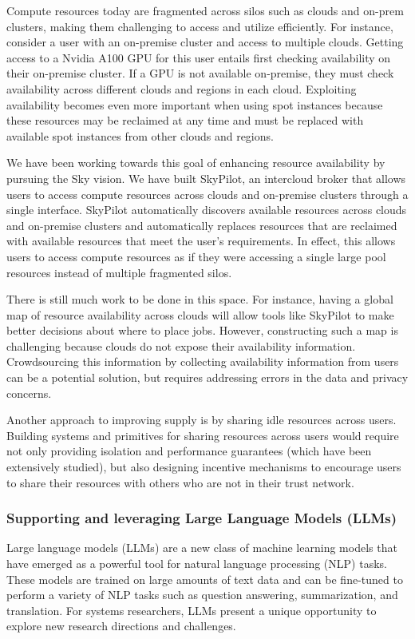 Compute resources today are fragmented across silos such as clouds and on-prem clusters, making them challenging to access and utilize efficiently. For instance, consider a user with an on-premise cluster and access to multiple clouds. Getting access to a Nvidia A100 GPU for this user entails first checking availability on their on-premise cluster. If a GPU is not available on-premise, they must check availability across different clouds and regions in each cloud. Exploiting availability becomes even more important when using spot instances because these resources may be reclaimed at any time and must be replaced with available spot instances from other clouds and regions.

We have been working towards this goal of enhancing resource availability by pursuing the Sky\cite{skyhotos} vision. We have built SkyPilot\cite{skypilot}, an intercloud broker that allows users to access compute resources across clouds and on-premise clusters through a single interface. SkyPilot automatically discovers available resources across clouds and on-premise clusters and automatically replaces resources that are reclaimed with available resources that meet the user's requirements. In effect, this allows users to access compute resources as if they were accessing a single large pool resources instead of multiple fragmented silos.

There is still much work to be done in this space. For instance, having a global map of resource availability across clouds will allow tools like SkyPilot to make better decisions about where to place jobs. However, constructing such a map is challenging because clouds do not expose their availability information. Crowdsourcing this information by collecting availability information from users can be a potential solution, but requires addressing errors in the data and privacy concerns. 

Another approach to improving supply is by sharing idle resources across users. Building systems and primitives for sharing resources across users would require not only providing isolation and performance guarantees (which have been extensively studied), but also designing incentive mechanisms to encourage users to share their resources with others who are not in their trust network.

\subsubsection{Supporting and leveraging Large Language Models (LLMs)}
Large language models (LLMs) are a new class of machine learning models that have emerged as a powerful tool for natural language processing (NLP) tasks. These models are trained on large amounts of text data and can be fine-tuned to perform a variety of NLP tasks such as question answering, summarization, and translation. For systems researchers, LLMs present a unique opportunity to explore new research directions and challenges.

